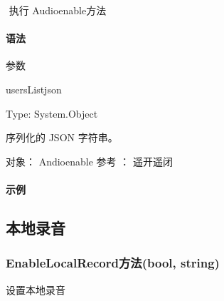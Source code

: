 \documentclass[letterpaper,10pt,english]{sphinxmanual}
\begin{document}
​ 执行 Audioenable方法


\paragraph{语法}
\label{\detokenize{csharp_activex:id151}}
%
\begin{sphinxVerbatim}[commandchars=\\\{\}]
  
\end{sphinxVerbatim}

参数

usersListjson

Type: System.Object

序列化的 JSON 字符串。

对象： Andioenable 参考 ： 遥开遥闭


\paragraph{示例}
\label{\detokenize{csharp_activex:id152}}
%
\begin{sphinxVerbatim}[commandchars=\\\{\}]
    
      
\end{sphinxVerbatim}


\subsection{本地录音}
\label{\detokenize{csharp_activex:id153}}

\subsubsection{EnableLocalRecord方法(bool, string)}
\label{\detokenize{csharp_activex:enablelocalrecord-bool-string}}
设置本地录音
\end{document}
